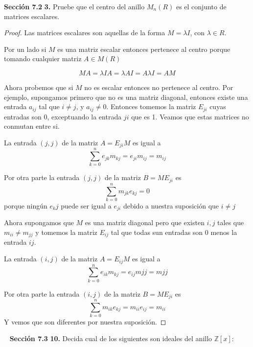 \documentclass[letter,twoside,12pt]{article}
\begin{document}
\textbf{Secci\'on 7.2} \textbf{3.}
Pruebe que el centro del anillo $M_n(R)$ es el conjunto de matrices escalares.

\begin{proof}
Las matrices escalares son aquellas de la forma $M=\lambda I$, con $\lambda \in R$.

Por un lado si $M$ es una matriz escalar entonces pertenece al centro porque tomando cualquier matriz $A \in M(R)$


\begin{equation}
MA=\lambda IA = \lambda A I=A \lambda I =AM \nonumber
\end{equation}

Ahora probemos que si $M$ no es escalar entonces no pertenece al centro. Por ejemplo, supongamos primero que no es una matriz diagonal, entonces existe una entrada $a_{ij}$ tal que $i \not = j$, y $a_{ij} \not = 0$. Entonces tomemos la matriz $E_{ji}$ cuyas entradas son 0, exceptuando la entrada $ji$ que es 1. Veamos que estas matrices no conmutan entre si.

La entrada $(j,j)$ de la matriz $A=E_{ji}M$ es igual a
\begin{equation}
\sum_{k=0}^n e_{jk}m_{kj}=e_{ji}m_{ij}=m_{ij} \nonumber
\end{equation} 

Por otra parte la entrada $(j,j)$ de la matriz $B=ME_{ji}$ es
\begin{equation}
\sum_{k=0}^n m_{jk}e_{kj}= 0 \nonumber
\end{equation}
porque ning\'un $e_kj$ puede ser igual a $e_{ji}$ debido a nuestra suposici\'on que $i \not  = j$

Ahora supongamos que $M$ es una matriz diagonal pero que existen $i,j$ tales que $m_{ii}\not = m_{jj}$ y tomemos la matriz $E_{ij}$ tal que todas sun entradas son 0 menos la entrada $ij$.

La entrada $(i,j)$ de la matriz $A=E_{ij}M$ es igual a
\begin{equation}
\sum_{k=0}^n e_{ik}m_{kj}=e_{ij}m{jj}= m{jj}\nonumber
\end{equation} 

Por otra parte la entrada $(i,j)$ de la matriz $B=ME_{ji}$ es
\begin{equation}
\sum_{k=0}^n m_{ik}e_{kj}= m_{ii}e_{ij}=m_{ii} \nonumber
\end{equation}
Y vemos que son diferentes por nuestra suposici\'on.
\end{proof}
\newpage
\mbox{ }
\newpage
\textbf{Secci\'on 7.3} \textbf{10.} Decida cual de los siguientes son ideales del anillo $\mathbb{Z}[x]$:
\end{document}
